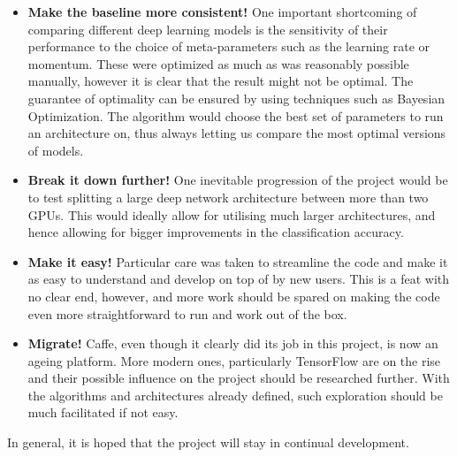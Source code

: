 \documentclass[a4paper, 12pt]{article}
\numberwithin{equation}{section}
\begin{document}
	\begin{itemize}
		\item \textbf{Make the baseline more consistent!} One important shortcoming of comparing different deep learning models is the sensitivity of their performance to the choice of meta-parameters such as the learning rate or momentum. These were optimized as much as was reasonably possible manually, however it is clear that the result might not be optimal. The guarantee of optimality can be ensured by using techniques such as Bayesian Optimization. The algorithm would choose the best set of parameters to run an architecture on, thus always letting us compare the most optimal versions of models.
		\item \textbf{Break it down further!} One inevitable progression of the project would be to test splitting a large deep network architecture between more than two GPUs. This would ideally allow for utilising much larger architectures, and hence allowing for bigger improvements in the classification accuracy.
		\item \textbf{Make it easy!} Particular care was taken to streamline the code and make it as easy to understand and develop on top of by new users. This is a feat with no clear end, however, and more work should be spared on making the code even more straightforward to run and work out of the box.
		\item \textbf{Migrate!} Caffe, even though it clearly did its job in this project, is now an ageing platform. More modern ones, particularly TensorFlow are on the rise and their possible influence on the project should be researched further. With the algorithms and architectures already defined, such exploration should be much facilitated if not easy.
	\end{itemize}

	In general, it is hoped that the project will stay in continual development.

	\newpage

	\clearpage

	\newpage
	\pagestyle{plain}
	
	
\end{document}
